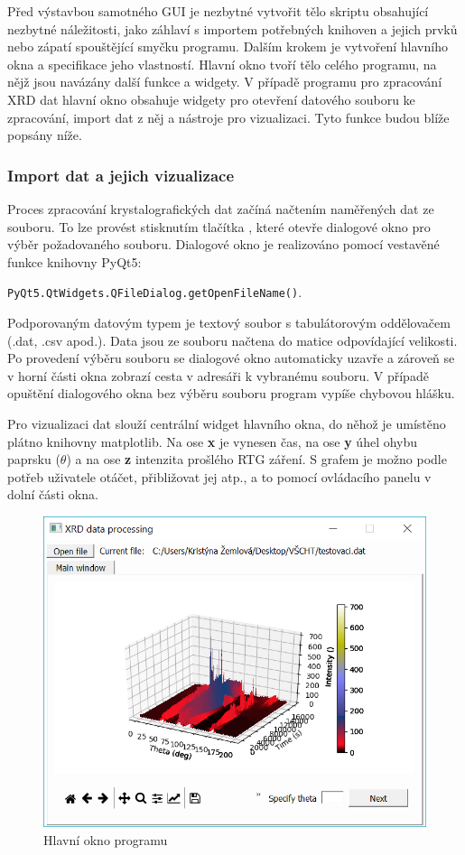 \documentclass[a4paper, 12pt]{article}
\begin{document}
Před výstavbou samotného GUI je nezbytné vytvořit tělo skriptu obsahující nezbytné náležitosti, jako záhlaví s importem potřebných knihoven a jejich prvků nebo zápatí spouštějící smyčku programu. Dalším krokem je vytvoření hlavního okna a specifikace jeho vlastností. Hlavní okno tvoří tělo celého programu, na nějž jsou navázány další funkce a widgety. V případě programu pro zpracování XRD dat hlavní okno obsahuje widgety pro otevření datového souboru ke zpracování, import dat z něj a nástroje pro vizualizaci. Tyto funkce budou blíže popsány níže.

\subsubsection{Import dat a jejich vizualizace} \label{sec:import}
Proces zpracování krystalografických dat začíná načtením naměřených dat ze souboru. To lze provést stisknutím tlačítka , které otevře dialogové okno pro výběr požadovaného souboru. Dialogové okno je realizováno pomocí vestavěné funkce knihovny PyQt5:
\begin{center}
 \texttt{PyQt5.QtWidgets.QFileDialog.getOpenFileName()}.   
\end{center}
\noindent Podporovaným datovým typem je textový soubor s tabulátorovým oddělovačem (.dat, .csv apod.). Data jsou ze souboru načtena do matice odpovídající velikosti. Po provedení výběru souboru se dialogové okno automaticky uzavře a zároveň se v horní části okna zobrazí cesta v adresáři k vybranému souboru. V případě opuštění dialogového okna bez výběru souboru program vypíše chybovou hlášku. 

Pro vizualizaci dat slouží centrální widget hlavního okna, do něhož je umístěno plátno knihovny matplotlib. Na ose \textbf{x} je vynesen čas, na ose \textbf{y} úhel ohybu paprsku ($\theta$) a na ose \textbf{z} intenzita prošlého RTG záření. S grafem je možno podle potřeb uživatele otáčet, přibližovat jej atp., a to pomocí ovládacího panelu v dolní části okna.

\begin{figure}[hbt!]
    \centering
    \includegraphics[width=\linewidth]{mainWin_grph.PNG}
    \caption{Hlavní okno programu}
    \label{fig:mainWin}
\end{figure}
\end{document}
